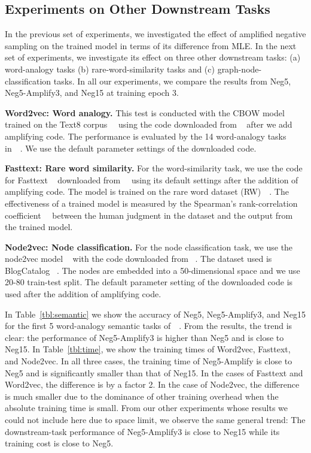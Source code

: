 \subsection{Experiments on Other Downstream Tasks}\label{sec:realworld}
In the previous set of experiments, we investigated the effect of amplified negative sampling on the trained model in terms of its difference from MLE. In the next set of experiments, we investigate its effect on three other downstream tasks: (a) word-analogy tasks (b) rare-word-similarity tasks and (c) graph-node-classification tasks. In all our experiments, we compare the results from Neg5, Neg5-Amplify3, and Neg15 at training epoch 3. 

\textbf{Word2vec: Word analogy.} This test is conducted with the CBOW model trained on the Text8 corpus~~\citep{mikolov2013distributed} using the code downloaded from ~\citep{word2vecGithub} after we add amplifying code. The performance is evaluated by the 14 word-analogy tasks in~~\citep{mikolov2013distributed}. We use the default parameter settings of the downloaded code.

\textbf{Fasttext: Rare word similarity.}
For the word-similarity task, we use the code for Fasttext ~\citep{fastText} downloaded from~~\citep{fastTextGithub} using its default settings after the addition of amplifying code. The model is trained on the rare word dataset (RW)~~\citep{luong2013better}. The effectiveness of a trained model is measured by the Spearman’s rank-correlation coefficient~~\citep{spearman1904proof} between the human judgment in the dataset and the output from the trained model.

\textbf{Node2vec: Node classification.} For the node classification task, we use the node2vec model ~\citep{node2vec-kdd2016} with the code downloaded from ~\citep{node2vecGithub}. The dataset used is BlogCatalog ~\citep{Zafarani+Liu:2009}. The nodes are embedded into a 50-dimensional space and we use 20-80 train-test split. The default parameter setting of the downloaded code is used after the addition of amplifying code.   

In Table~\ref{tbl:semantic} we show the accuracy of Neg5, Neg5-Amplify3, and Neg15 for the first 5 word-analogy semantic tasks of~~\citep{mikolov2013distributed}. From the results, the trend is clear: the performance of Neg5-Amplify3 is higher than Neg5 and is close to Neg15. In Table~\ref{tbl:time}, we show the training times of Word2vec, Fasttext, and Node2vec. In all three cases, the training time of Neg5-Amplify is close to Neg5 and is significantly smaller than that of Neg15. In the cases of Fasttext and Word2vec, the difference is by a factor 2. In the case of Node2vec, the difference is much smaller due to the dominance of other training overhead when the absolute training time is small.
From our other experiments whose results we could not include here due to space limit, we observe the same general trend: The downstream-task performance of Neg5-Amplify3 is close to Neg15 while its training cost is close to Neg5. 

